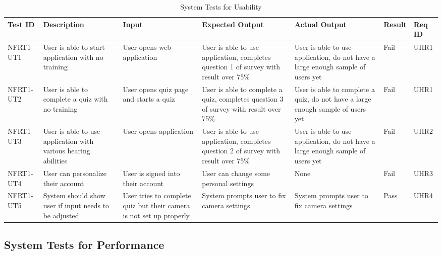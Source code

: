 \documentclass[12pt, titlepage]{article}
\begin{document}
\begin{longtable}{|p{1.5cm}|p{2.5cm}|p{2cm}|p{2cm}|p{2cm}|p{1.5cm}|p{1.5cm}|}
\caption{System Tests for Usability} \\
\hline
\textbf{Test ID} & \textbf{Description} & \textbf{Input} & \textbf{Expected Output} & \textbf{Actual Output} & \textbf{Result} & \textbf{Req ID}\\
\hline
NFRT1-UT1 & User is able to start application with no training & User opens web application & User is able to use application, completes question 1 of survey with result over 75\% & User is able to use application, do not have a large enough sample of users yet & Fail & UHR1 \\
\hline
NFRT1-UT2 & User is able to complete a quiz with no training & User opens quiz page and starts a quiz & User is able to complete a quiz, completes question 3 of survey with result over 75\% & User is able to complete a quiz, do not have a large enough sample of users yet & Fail & UHR1 \\
\hline
NFRT1-UT3 & User is able to use application with various hearing abilities & User opens application & User is able to use application, completes question 2 of survey with result over 75\% & User is able to use application, do not have a large enough sample of users yet & Fail & UHR2 \\
\hline
NFRT1-UT4 & User can personalize their account & User is signed into their account & User can change some personal settings & None & Fail & UHR3 \\
\hline
NFRT1-UT5 & System should show user if input needs to be adjusted & User tries to complete quiz but their camera is not set up properly & System prompts user to fix camera settings & System prompts user to fix camera settings & Pass & UHR4 \\
\bottomrule
\end{longtable}



\RaggedRight
\subsection{System Tests for Performance}
\end{document}
